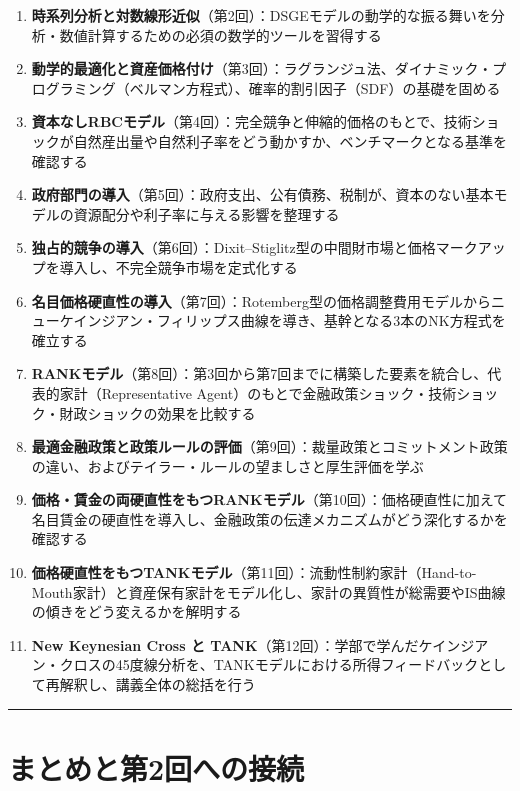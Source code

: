 \documentclass[
  japanese,
  lualatex,
  ja=standard,
  12pt,
  a4paper]{ltjsarticle}
\providecommand{\tightlist}{%
  \setlength{\itemsep}{0pt}\setlength{\parskip}{0pt}}
\begin{document}
\begin{enumerate}
\def\labelenumi{\arabic{enumi}.}
\tightlist
\item
  \textbf{時系列分析と対数線形近似}（第2回）：DSGEモデルの動学的な振る舞いを分析・数値計算するための必須の数学的ツールを習得する
\item
  \textbf{動学的最適化と資産価格付け}（第3回）：ラグランジュ法、ダイナミック・プログラミング（ベルマン方程式）、確率的割引因子（SDF）の基礎を固める
\item
  \textbf{資本なしRBCモデル}（第4回）：完全競争と伸縮的価格のもとで、技術ショックが自然産出量や自然利子率をどう動かすか、ベンチマークとなる基準を確認する
\item
  \textbf{政府部門の導入}（第5回）：政府支出、公有債務、税制が、資本のない基本モデルの資源配分や利子率に与える影響を整理する
\item
  \textbf{独占的競争の導入}（第6回）：Dixit--Stiglitz型の中間財市場と価格マークアップを導入し、不完全競争市場を定式化する
\item
  \textbf{名目価格硬直性の導入}（第7回）：Rotemberg型の価格調整費用モデルからニューケインジアン・フィリップス曲線を導き、基幹となる3本のNK方程式を確立する
\item
  \textbf{RANKモデル}（第8回）：第3回から第7回までに構築した要素を統合し、代表的家計（Representative
  Agent）のもとで金融政策ショック・技術ショック・財政ショックの効果を比較する
\item
  \textbf{最適金融政策と政策ルールの評価}（第9回）：裁量政策とコミットメント政策の違い、およびテイラー・ルールの望ましさと厚生評価を学ぶ
\item
  \textbf{価格・賃金の両硬直性をもつRANKモデル}（第10回）：価格硬直性に加えて名目賃金の硬直性を導入し、金融政策の伝達メカニズムがどう深化するかを確認する
\item
  \textbf{価格硬直性をもつTANKモデル}（第11回）：流動性制約家計（Hand-to-Mouth家計）と資産保有家計をモデル化し、家計の異質性が総需要やIS曲線の傾きをどう変えるかを解明する
\item
  \textbf{New Keynesian Cross と
  TANK}（第12回）：学部で学んだケインジアン・クロスの45度線分析を、TANKモデルにおける所得フィードバックとして再解釈し、講義全体の総括を行う
\end{enumerate}

\begin{center}\rule{0.5\linewidth}{0.5pt}\end{center}

\section{まとめと第2回への接続}\label{ux307eux3068ux3081ux3068ux7b2c2ux56deux3078ux306eux63a5ux7d9a}
\end{document}
